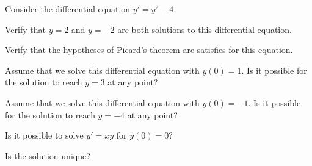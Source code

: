 \documentclass{ximera}
\begin{document}
\begin{exercise}
    Consider the differential equation $y' = y^2 - 4$.
    
    Verify that $y=2$ and $y=-2$ are both solutions to this differential equation.
    \begin{multipleChoice}
    \end{multipleChoice}
    \begin{problem}
        Verify that the hypotheses of Picard's theorem are satisfies for this equation.
        \begin{multipleChoice}
        \end{multipleChoice}
        \begin{problem}
            Assume that we solve this differential equation with $y(0) = 1$. Is it possible for the solution to reach $y=3$ at any point?
            \begin{multipleChoice}
            \end{multipleChoice}
            \begin{problem}
                Assume that we solve this differential equation with $y(0) = -1$. Is it possible for the solution to reach $y=-4$ at any point?
                \begin{multipleChoice}
                \end{multipleChoice}
            \end{problem}
        \end{problem}
    \end{problem}
\end{exercise}

\begin{exercise}%
    Is it possible to solve $y' = xy$ for $y(0) = 0$?  
    \begin{multipleChoice}
    \end{multipleChoice}
    \begin{problem}
        Is the solution unique?
        \begin{multipleChoice}
        \end{multipleChoice}
    \end{problem}
\end{exercise}
\end{document}
